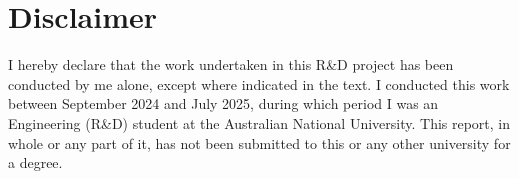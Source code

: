 \section*{Disclaimer}

I hereby declare that the work undertaken in this R\&D project has been conducted
by me alone, except where indicated in the text. I conducted this work between
September 2024 and July 2025, during which period I was an Engineering (R\&D)
student at the Australian National University. This report, in whole or any part
of it, has not been submitted to this or any other university for a degree.





